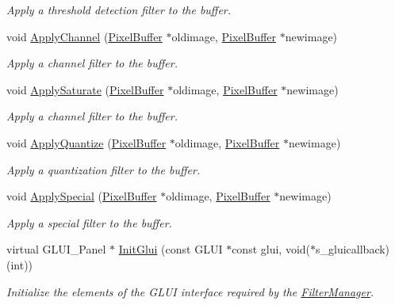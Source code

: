 \begin{DoxyCompactItemize}
\begin{DoxyCompactList}\small\item\em Apply a threshold detection filter to the buffer. \end{DoxyCompactList}\item 
void \hyperlink{classimage__tools_1_1FilterManager_ac4b165a2af7fa7b02c6670471729f62e}{Apply\+Channel} (\hyperlink{classimage__tools_1_1PixelBuffer}{Pixel\+Buffer} $\ast$oldimage, \hyperlink{classimage__tools_1_1PixelBuffer}{Pixel\+Buffer} $\ast$newimage)
\begin{DoxyCompactList}\small\item\em Apply a channel filter to the buffer. \end{DoxyCompactList}\item 
void \hyperlink{classimage__tools_1_1FilterManager_a71446251fcc00f4f8dce09de208f430f}{Apply\+Saturate} (\hyperlink{classimage__tools_1_1PixelBuffer}{Pixel\+Buffer} $\ast$oldimage, \hyperlink{classimage__tools_1_1PixelBuffer}{Pixel\+Buffer} $\ast$newimage)
\begin{DoxyCompactList}\small\item\em Apply a channel filter to the buffer. \end{DoxyCompactList}\item 
void \hyperlink{classimage__tools_1_1FilterManager_a8d1bb7cde72a00fb1bcbd3819c0015af}{Apply\+Quantize} (\hyperlink{classimage__tools_1_1PixelBuffer}{Pixel\+Buffer} $\ast$oldimage, \hyperlink{classimage__tools_1_1PixelBuffer}{Pixel\+Buffer} $\ast$newimage)
\begin{DoxyCompactList}\small\item\em Apply a quantization filter to the buffer. \end{DoxyCompactList}\item 
void \hyperlink{classimage__tools_1_1FilterManager_a7e2e1dcb6eb445bebcecb25b964817fc}{Apply\+Special} (\hyperlink{classimage__tools_1_1PixelBuffer}{Pixel\+Buffer} $\ast$oldimage, \hyperlink{classimage__tools_1_1PixelBuffer}{Pixel\+Buffer} $\ast$newimage)
\begin{DoxyCompactList}\small\item\em Apply a special filter to the buffer. \end{DoxyCompactList}\item 
virtual G\+L\+U\+I\+\_\+\+Panel $\ast$ \hyperlink{classimage__tools_1_1FilterManager_a613964542f112cb163a530b542aaa66e}{Init\+Glui} (const G\+L\+UI $\ast$const glui, void($\ast$s\+\_\+gluicallback)(int))
\begin{DoxyCompactList}\small\item\em Initialize the elements of the G\+L\+UI interface required by the \hyperlink{classimage__tools_1_1FilterManager}{Filter\+Manager}. \end{DoxyCompactList}\end{DoxyCompactItemize}
